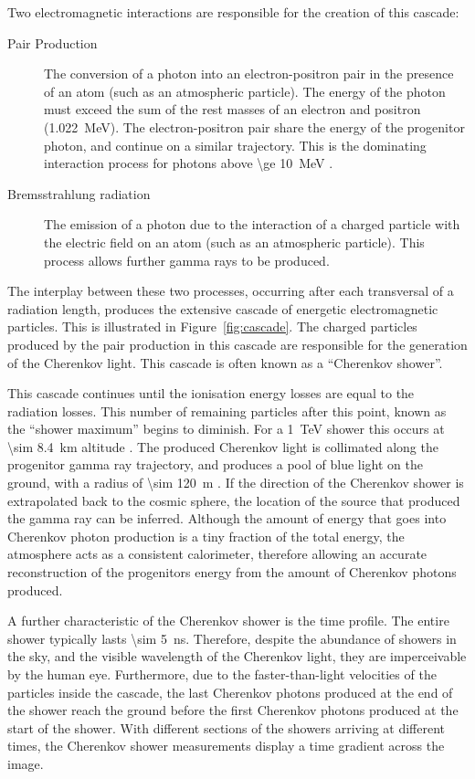 Two electromagnetic interactions are responsible for the creation of this cascade:
\begin{description}
\item [Pair Production] The conversion of a photon into an electron-positron pair in the presence of an atom (such as an atmospheric particle). The energy of the photon must exceed the sum of the rest masses of an electron and positron (\SI{1.022}{MeV}). The electron-positron pair share the energy of the progenitor photon, and continue on a similar trajectory. This is the dominating interaction process for photons above \SI{\ge 10}{MeV} \cite{Weekes2003}.
\item [Bremsstrahlung radiation] The emission of a photon due to the interaction of a charged particle with the electric field on an atom (such as an atmospheric particle). This process allows further gamma rays to be produced.
\end{description}
The interplay between these two processes, occurring after each transversal of a radiation length, produces the extensive cascade of energetic electromagnetic particles. This is illustrated in Figure~\ref{fig:cascade}. The charged particles produced by the pair production in this cascade are responsible for the generation of the Cherenkov light. This cascade is often known as a ``Cherenkov shower''.

This cascade continues until the ionisation energy losses are equal to the radiation losses. This number of remaining particles after this point, known as the ``shower maximum'' begins to diminish. For a \SI{1}{TeV} shower this occurs at \SI{\sim 8.4}{km} altitude \cite{Weekes2003}. The produced Cherenkov light is collimated along the progenitor gamma ray trajectory, and produces a pool of blue light on the ground, with a radius of \SI{\sim 120}{m} \cite{Hillas1996a}. If the direction of the Cherenkov shower is extrapolated back to the cosmic sphere, the location of the source that produced the gamma ray can be inferred. Although the amount of energy that goes into Cherenkov photon production is a tiny fraction of the total energy, the atmosphere acts as a consistent calorimeter, therefore allowing an accurate reconstruction of the progenitors energy from the amount of Cherenkov photons produced. 

A further characteristic of the Cherenkov shower is the time profile. The entire shower typically lasts \SI{\sim 5}{ns}. Therefore, despite the abundance of showers in the sky, and the visible wavelength of the Cherenkov light, they are imperceivable by the human eye. Furthermore, due to the faster-than-light velocities of the particles inside the cascade, the last Cherenkov photons produced at the end of the shower reach the ground before the first Cherenkov photons produced at the start of the shower. With different sections of the showers arriving at different times, the Cherenkov shower measurements display a time gradient across the image. 

